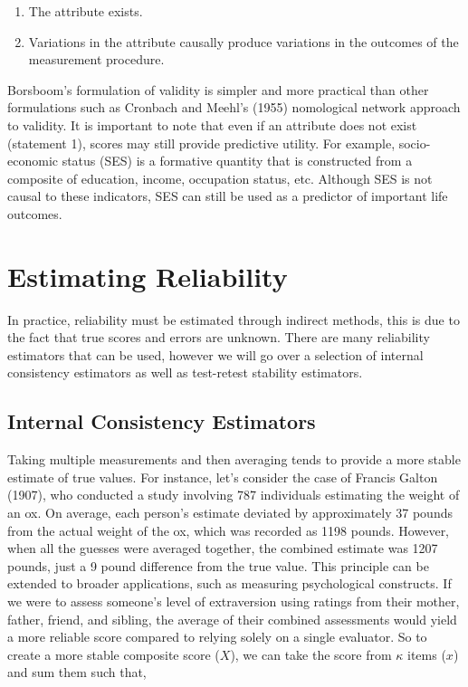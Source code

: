\documentclass[
  letterpaper,
  DIV=11,
  numbers=noendperiod]{scrreprt}
\begin{document}
\begin{enumerate}
\def\labelenumi{\arabic{enumi}.}
\item
  The attribute exists.
\item
  Variations in the attribute causally produce variations in the
  outcomes of the measurement procedure.
\end{enumerate}

Borsboom's formulation of validity is simpler and more practical than
other formulations such as Cronbach and Meehl's (1955) nomological
network approach to validity. It is important to note that even if an
attribute does not exist (statement 1), scores may still provide
predictive utility. For example, socio-economic status (SES) is a
formative quantity that is constructed from a composite of education,
income, occupation status, etc. Although SES is not causal to these
indicators, SES can still be used as a predictor of important life
outcomes.

\section{Estimating Reliability}\label{estimating-reliability}

In practice, reliability must be estimated through indirect methods,
this is due to the fact that true scores and errors are unknown. There
are many reliability estimators that can be used, however we will go
over a selection of internal consistency estimators as well as
test-retest stability estimators.

\subsection{Internal Consistency
Estimators}\label{internal-consistency-estimators}

Taking multiple measurements and then averaging tends to provide a more
stable estimate of true values. For instance, let's consider the case of
Francis Galton (1907), who conducted a study involving 787 individuals
estimating the weight of an ox. On average, each person's estimate
deviated by approximately 37 pounds from the actual weight of the ox,
which was recorded as 1198 pounds. However, when all the guesses were
averaged together, the combined estimate was 1207 pounds, just a 9 pound
difference from the true value. This principle can be extended to
broader applications, such as measuring psychological constructs. If we
were to assess someone's level of extraversion using ratings from their
mother, father, friend, and sibling, the average of their combined
assessments would yield a more reliable score compared to relying solely
on a single evaluator. So to create a more stable composite score
(\(X\)), we can take the score from \(\kappa\) items (\(x\)) and sum
them such that,
\end{document}
